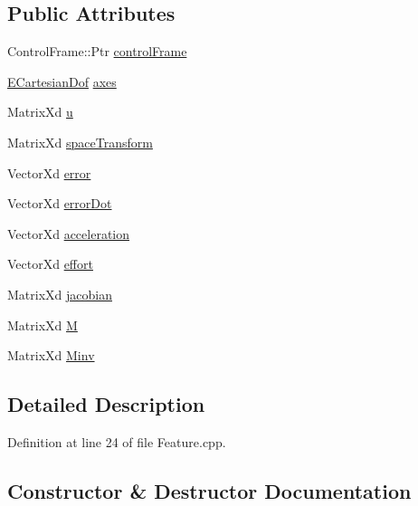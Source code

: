 \subsection*{Public Attributes}
\begin{DoxyCompactItemize}
\item 
Control\+Frame\+::\+Ptr \hyperlink{structocra_1_1PositionFeature_1_1Pimpl_ad770aac1608c2e6ccf13ee84539313c5}{control\+Frame}
\item 
\hyperlink{namespaceocra_a436781c7059a0f76027df1c652126260}{E\+Cartesian\+Dof} \hyperlink{structocra_1_1PositionFeature_1_1Pimpl_a671e502b35c4d7ec8c8f972933ebac1e}{axes}
\item 
Matrix\+Xd \hyperlink{structocra_1_1PositionFeature_1_1Pimpl_a5299db1f5f86c7a5808fbf1738ee438a}{u}
\item 
Matrix\+Xd \hyperlink{structocra_1_1PositionFeature_1_1Pimpl_a2e80e58cc94be8c44f8fee3dd030192e}{space\+Transform}
\item 
Vector\+Xd \hyperlink{structocra_1_1PositionFeature_1_1Pimpl_ab0c14028446505c11d15d0dfce51b97a}{error}
\item 
Vector\+Xd \hyperlink{structocra_1_1PositionFeature_1_1Pimpl_a3bff7b8d61a5575a68503d6767478950}{error\+Dot}
\item 
Vector\+Xd \hyperlink{structocra_1_1PositionFeature_1_1Pimpl_a2a251a27da0e093461ba88a7dcb5ce1d}{acceleration}
\item 
Vector\+Xd \hyperlink{structocra_1_1PositionFeature_1_1Pimpl_a66425331a37215913daa3ca7de5bce57}{effort}
\item 
Matrix\+Xd \hyperlink{structocra_1_1PositionFeature_1_1Pimpl_a9cd18a0039e2ebbce05d78403667dd02}{jacobian}
\item 
Matrix\+Xd \hyperlink{structocra_1_1PositionFeature_1_1Pimpl_aa061dcd02d8f11de5edd55e8f2535bfe}{M}
\item 
Matrix\+Xd \hyperlink{structocra_1_1PositionFeature_1_1Pimpl_a7f6b8df16f7f9cbbe8e917e3ed4811eb}{Minv}
\end{DoxyCompactItemize}


\subsection{Detailed Description}


Definition at line 24 of file Feature.\+cpp.



\subsection{Constructor \& Destructor Documentation}

